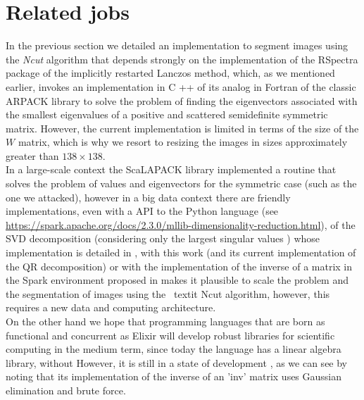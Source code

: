 \documentclass[conference]{IEEEtran}
\begin{document}
\section{Related jobs}
In the previous section we detailed an implementation to segment images using the \textit {Ncut} algorithm that depends strongly on the implementation of the RSpectra \cite {RSpectra} package of the implicitly restarted Lanczos method, which, as we mentioned earlier, invokes an implementation in C ++ of its analog in Fortran of the classic ARPACK \cite {Arpack} library to solve the problem of finding the eigenvectors associated with the smallest eigenvalues of a positive and scattered semidefinite symmetric matrix. However, the current implementation is limited in terms of the size of the $ W $ matrix, which is why we resort to resizing the images in sizes approximately greater than $ 138 \times 138$. \\
In a large-scale context the ScaLAPACK \cite {ScaLAPACK} library implemented a routine that solves the problem of values and eigenvectors for the symmetric case (such as the one we attacked), however in a big data context there are friendly implementations, even with a API to the Python language (see \url {https://spark.apache.org/docs/2.3.0/mllib-dimensionality-reduction.html}), of the SVD decomposition (considering only the largest singular values ) whose implementation is detailed in \cite {MatrixSpark}, with this work (and its current implementation of the QR decomposition) or with the implementation of the inverse of a matrix in the Spark environment proposed in \cite {Sparkbased} makes it plausible to scale the problem and the segmentation of images using the \ textit {Ncut} algorithm, however, this requires a new data and computing architecture. \\
On the other hand we hope that programming languages that are born as functional and concurrent as Elixir \cite{Elixir} will develop robust libraries for scientific computing in the medium term, since today the language has a linear algebra library, without However, it is still in a state of development \cite {ElixirLib}, as we can see by noting that its implementation of the inverse of an 'inv' matrix uses Gaussian elimination and brute force.
\end{document}
